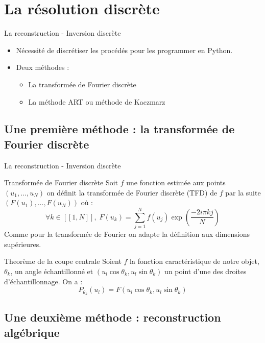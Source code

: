 \documentclass{beamer}
\newcommand*{\iintervalle}[2]{[\![#1,#2]\!]}
\begin{document}
\section{La résolution discrète}
\begin{frame}{La reconstruction - Inversion discrète}
    \begin{itemize}
        \item Nécessité de discrétiser les procédés pour les programmer en Python. 
        \item Deux méthodes : 
            \begin{itemize}
                \item La transformée de Fourier discrète
                \item La méthode ART ou méthode de Kaczmarz
            \end{itemize}
    \end{itemize}
\end{frame}
\subsection{Une première méthode : la transformée de Fourier discrète}
\begin{frame}{La reconstruction - Inversion discrète}
    \begin{beamerboxesrounded}{Transformée de Fourier discrète}
        Soit $f$ une fonction estimée aux points $(u_1, ... , u_N)$ on définit la transformée de Fourier discrète (TFD) de $f$ par la suite $(F(u_1), ... , F(u_N))$
        où : $$\forall k \in \iintervalle{1}{N}, \; F(u_k) = \sum_{j = 1}^N f(u_j)\exp\left(\frac{-2i\pi k j}{N}\right)$$
        Comme pour la transformée de Fourier on adapte la définition aux dimensions supérieures.
    \end{beamerboxesrounded}
    \begin{beamerboxesrounded}{Theorème de la coupe centrale}
        Soient $f$ la fonction caractéristique de notre objet, $\theta_k$, un angle échantillonné et $(u_l \cos \theta_k, u_l \sin \theta_k)$ un point d'une des droites d'échantillonnage. On a : 
        $$P_{\theta_k}(u_l) = F(u_l \cos \theta_k, u_l \sin \theta_k)$$
    \end{beamerboxesrounded}
\end{frame}

\subsection{Une deuxième méthode : reconstruction algébrique}
\end{document}
